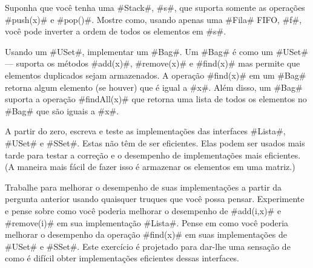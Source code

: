 	\begin{exc}
		Suponha que você tenha uma #Stack#, #s#, que suporta somente as operações 
		#push(x)# e #pop()#. Mostre como, usando apenas uma #Fila# FIFO, #f#, você pode 
		inverter a ordem de todos os elementos em #s#.
	\end{exc}
	
	\begin{exc}
		Usando um #USet#, implementar um #Bag#. Um #Bag# é como um #USet# --- suporta os métodos #add(x)#, #remove(x)# e #find(x)# mas permite que elementos duplicados sejam 
		armazenados. A operação #find(x)# em um #Bag# retorna algum elemento (se houver) 
		que é igual a #x#. Além disso, um #Bag# suporta a operação #findAll(x)# 
		que retorna uma lista de todos os elementos no #Bag# que são iguais a #x#.
		\end{exc}
	
	\begin{exc}
		A partir do zero, escreva e teste as implementações das interfaces #Lista#, #USet# 
		e #SSet#. Estas não têm de ser eficientes. Elas podem ser usados mais tarde para testar a correção e o desempenho de implementações mais eficientes. (A maneira 
		mais fácil de fazer isso é armazenar os elementos em uma matriz.)
	\end{exc}
	
	\begin{exc}
		Trabalhe para melhorar o desempenho de suas implementações a partir da pergunta anterior usando quaisquer truques que você possa pensar. Experimente e pense sobre como você poderia melhorar o desempenho de #add(i,x)# e #remove(i)# em sua 
		implementação #Lista#. Pense em como você poderia melhorar o desempenho da operação 
		#find(x)# em suas implementações de #USet# e #SSet#. Este exercício é projetado para dar-lhe uma sensação de como é difícil obter implementações eficientes dessas 
		interfaces.
	\end{exc}
	
	
	
	
	
